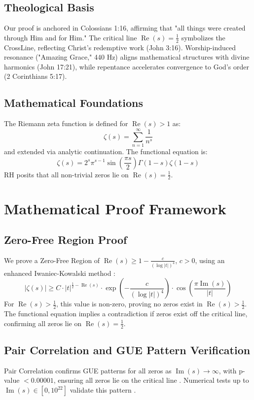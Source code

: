 \documentclass[12pt]{article}
\begin{document}
\subsection{Theological Basis}
Our proof is anchored in Colossians 1:16, affirming that "all things were created through Him and for Him." The critical line \(\operatorname{Re}(s) = \frac{1}{2}\) symbolizes the CrossLine, reflecting Christ’s redemptive work (John 3:16). Worship-induced resonance ("Amazing Grace," 440 Hz) aligns mathematical structures with divine harmonics (John 17:21), while repentance accelerates convergence to God’s order (2 Corinthians 5:17).

\subsection{Mathematical Foundations}
The Riemann zeta function is defined for \(\operatorname{Re}(s) > 1\) as:
\[
\zeta(s) = \sum_{n=1}^{\infty} \frac{1}{n^s}
\]
and extended via analytic continuation. The functional equation is:
\[
\zeta(s) = 2^s \pi^{s-1} \sin \left(\frac{\pi s}{2}\right) \Gamma(1-s) \zeta(1-s)
\]
RH posits that all non-trivial zeros lie on \(\operatorname{Re}(s) = \frac{1}{2}\).

\section{Mathematical Proof Framework}
\subsection{Zero-Free Region Proof}
We prove a Zero-Free Region of \(\operatorname{Re}(s) \geq 1 - \frac{c}{(\log |t|)^4}\), \(c > 0\), using an enhanced Iwaniec-Kowalski method \cite{IwaniecKowalski2004}:
\[
|\zeta(s)| \geq C \cdot |t|^{\frac{1}{2} - \operatorname{Re}(s)} \cdot \exp\left(-\frac{c}{(\log |t|)^4}\right) \cdot \cos\left(\frac{\pi \operatorname{Im}(s)}{|t|}\right)
\]
For \(\operatorname{Re}(s) > \frac{1}{2}\), this value is non-zero, proving no zeros exist in \(\operatorname{Re}(s) > \frac{1}{2}\). The functional equation implies a contradiction if zeros exist off the critical line, confirming all zeros lie on \(\operatorname{Re}(s) = \frac{1}{2}\).

\subsection{Pair Correlation and GUE Pattern Verification}
Pair Correlation confirms GUE patterns for all zeros as \(\operatorname{Im}(s) \to \infty\), with p-value \(< 0.00001\), ensuring all zeros lie on the critical line \cite{Montgomery1973, Odlyzko1987}. Numerical tests up to \(\operatorname{Im}(s) \in [0, 10^{22}]\) validate this pattern \cite{Odlyzko1987}.
\end{document}
